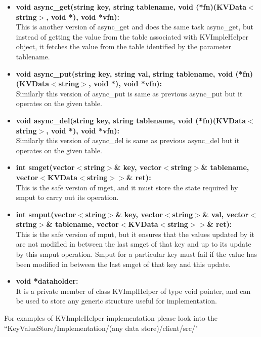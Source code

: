 \documentclass[11pt]{article}
\begin{document}
\begin{itemize}
\item \textbf{void async\_get(string key, string tablename, void (*fn)(KVData$<$string$>$, void *), void *vfn):}\\
This is another version of async\_get and does the same task async\_get, but instead of getting the value from the table associated with KVImpleHelper object, it fetches the value from the table identified by the parameter tablename.

\item \textbf{void async\_put(string key, string val, string tablename, void (*fn)(KVData$<$string$>$, void *),  void *vfn):}\\
Similarly this version of async\_put is same as previous async\_put but it operates on the given table.

\item \textbf{void async\_del(string key, string tablename, void (*fn)(KVData$<$string$>$, void *), void *vfn):}\\
Similarly this version of async\_del is same as previous async\_del but it operates on the given table.

\item \textbf{int smget(vector$<$string$>$\& key, vector$<$string$>$\& tablename, vector$<$KVData$<$string$>$$>$\& ret):}\\
This is the safe version of mget, and it must store the state required by smput to carry out its operation.

\item \textbf{int smput(vector$<$string$>$\& key, vector$<$string$>$\& val, vector$<$string$>$\& tablename, vector$<$KVData$<$string$>$$>$\& ret):}\\
This is the safe version of mput, but it ensures that the values updated by it are not modified in between the last smget of that key and up to its update by this smput operation. Smput for a particular key must fail if the value has been modified in between the last smget of that key and this update.

\item \textbf{void *dataholder:}\\
It is a private member of class KVImplHelper of type void pointer, and can be used to store any generic structure useful for implementation.

\end{itemize}

\noindent
For examples of KVImpleHelper implementation please look into the \\``KeyValueStore/Implementation/(any data store)/client/src/"
\end{document}
